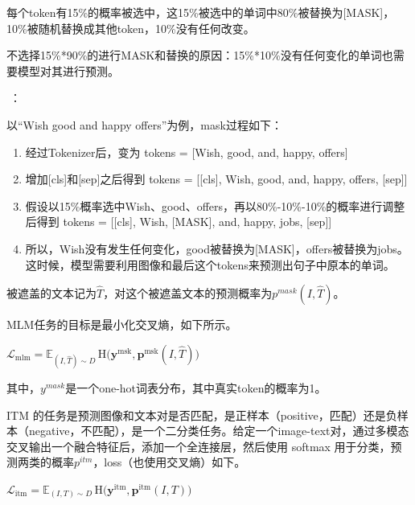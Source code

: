 \documentclass[zihao=false,fontset=windows]{ctexart}
\newcommand{\feiEmoji}[1]{{\emojifont #1}}
\newcommand{\incode}[1]{\colorbox{inlinebg}{\ttfamily\small #1}}
\newcommand{\bigmath}[1]{%
  \begin{center}\large$\displaystyle #1$\end{center}%
}
\begin{document}
\begin{feishuquote}
每个token有15\%的概率被选中，这15\%被选中的单词中80\%被替换为[MASK]，10\%被随机替换成其他token，10\%没有任何改变。\par
不选择15\%*90\%的进行MASK和替换的原因：15\%*10\%没有任何变化的单词也需要模型对其进行预测。\par
\feiEmoji{🌰}：\par
以“Wish good and happy offers”为例，mask过程如下：\par
\begin{enumerate}
\item 经过Tokenizer后，变为
\incode{tokens = [Wish, good, and, happy, offers]}\par
\item 增加[cls]和[sep]之后得到
\incode{tokens = [[cls], Wish, good, and, happy, offers, [sep]]}\par
\item 假设以15\%概率选中\incode{Wish}、\incode{good}、\incode{offers}，再以80\%-10\%-10\%的概率进行调整后得到
\incode{tokens = [[cls], Wish, [MASK], and, happy, jobs, [sep]]}\par
\item 所以，\incode{Wish}没有发生任何变化，\incode{good}被替换为\incode{[MASK]}，\incode{offers}被替换为\incode{jobs}。这时候，模型需要利用图像和最后这个tokens来预测出句子中原本的单词。
\end{enumerate}
\end{feishuquote}
被遮盖的文本记为$\hat{T}$，对这个被遮盖文本的预测概率为$p^{mask}(I,\hat{T})$。\par
MLM任务的目标是最小化交叉熵，如下所示。\par
\bigmath{
\mathcal{L}_{\mathrm{mlm}}=\mathbb{E}_{(I,\hat{T})\sim D}\,\mathrm{H}\bigl(\mathbf{y}^{\mathrm{msk}},\mathbf{p}^{\mathrm{msk}}(I,\hat{T})\bigr)
}
其中，$y^{mask}$是一个one-hot词表分布，其中真实token的概率为1。\par
\par\vspace{0.75em}\par\vspace{0.28em}
ITM 的任务是预测图像和文本对是否匹配，是正样本（positive，匹配）还是负样本（negative，不匹配），是一个二分类任务。给定一个image-text对，通过多模态交叉输出一个融合特征后，添加一个全连接层，然后使用 softmax 用于分类，预测两类的概率$p^{itm}$，loss（也使用交叉熵）如下。\par
\bigmath{
\mathcal{L}_{\mathrm{itm}}=\mathbb{E}_{(I,T)\sim D}\,\mathrm{H}\bigl(\mathbf{y}^{\mathrm{itm}},\mathbf{p}^{\mathrm{itm}}(I,T)\bigr)
}
\end{document}
